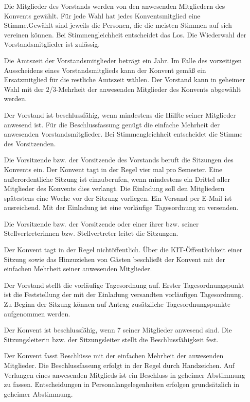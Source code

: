 \documentclass[a4paper, parskip=half, numbers=noenddot]{scrartcl}
\begin{document}
\begin{contract}
\label{wahl}
Die Mitglieder des Vorstands werden von den anwesenden Mitgliedern des Konvents gewählt. Für jede Wahl hat jedes Konventsmitglied eine Stimme.Gewählt sind jeweils die Personen, die die meisten Stimmen auf sich vereinen können. Bei Stimmengleichheit entscheidet das Los. Die Wiederwahl der Vorstandsmitglieder ist zulässig.

Die Amtszeit der Vorstandsmitglieder beträgt ein Jahr. Im Falle des vorzeitigen Ausscheidens
eines Vorstandsmitglieds kann der Konvent gemäß  ein Ersatzmitglied für die restliche Amtszeit wählen. Der Vorstand kann in geheimer Wahl mit der 2/3-Mehrheit der anwesenden Mitglieder des Konvents abgewählt werden.

Der Vorstand ist beschlussfähig, wenn mindestens die Hälfte seiner Mitglieder anwesend ist. Für die Beschlussfassung genügt die einfache Mehrheit der anwesenden Vorstandsmitglieder. Bei Stimmengleichheit entscheidet die Stimme des Vorsitzenden.


Die Vorsitzende bzw. der Vorsitzende des Vorstands beruft die Sitzungen des Konvents ein.
Der Konvent tagt in der Regel vier mal pro Semester. Eine außerordentliche Sitzung ist einzuberufen, wenn mindestens ein Drittel aller Mitglieder des Konvents dies verlangt. Die Einladung soll den Mitgliedern spätestens eine Woche vor der Sitzung vorliegen. Ein Versand per E-Mail ist ausreichend. Mit der Einladung ist eine vorläufige Tagesordnung zu versenden.

Die Vorsitzende bzw. der Vorsitzende oder einer ihrer bzw. seiner Stellvertreterinnen bzw. Stellvertreter leitet die Sitzungen.	

Der Konvent tagt in der Regel nichtöffentlich. Über die KIT-Öffentlichkeit einer Sitzung sowie das Hinzuziehen von Gästen beschließt der Konvent mit der einfachen Mehrheit seiner anwesenden Mitglieder.

Der Vorstand stellt die vorläufige Tagesordnung auf. Erster Tagesordnungspunkt ist die Feststellung der mit der Einladung versandten vorläufigen Tagesordnung. Zu Beginn der Sitzung können auf Antrag zusätzliche Tagesordnungspunkte aufgenommen werden.

Der Konvent ist beschlussfähig, wenn 7 seiner Mitglieder anwesend sind. Die Sitzungsleiterin bzw. der Sitzungsleiter stellt die Beschlussfähigkeit fest.	

Der Konvent fasst Beschlüsse mit der einfachen Mehrheit der anwesenden Mitglieder. Die Beschlussfassung erfolgt in der Regel durch Handzeichen. Auf Verlangen eines anwesenden Mitglieds ist ein Beschluss in geheimer Abstimmung zu fassen. Entscheidungen in Personalangelegenheiten erfolgen grundsätzlich in geheimer Abstimmung.


\end{contract}
\end{document}
